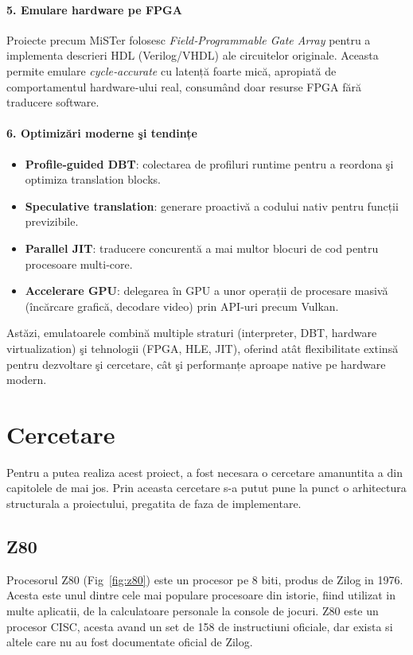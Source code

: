 \documentclass[titlepage,12pt]{article}
\begin{document}
\paragraph{5. Emulare hardware pe FPGA}  
Proiecte precum MiSTer folosesc \emph{Field‑Programmable Gate Array} pentru a implementa descrieri HDL (Verilog/VHDL) ale circuitelor originale. Aceasta permite emulare \emph{cycle‑accurate} cu latență foarte mică, apropiată de comportamentul hardware‑ului real, consumând doar resurse FPGA fără traducere software.

\paragraph{6. Optimizări moderne şi tendințe}  
\begin{itemize}
  \item \textbf{Profile‑guided DBT}: colectarea de profiluri runtime pentru a reordona şi optimiza translation blocks.  
  \item \textbf{Speculative translation}: generare proactivă a codului nativ pentru funcții pre­vizibile.  
  \item \textbf{Parallel JIT}: traducere concurentă a mai multor blocuri de cod pentru procesoare multi‑core.  
  \item \textbf{Accelerare GPU}: delegarea în GPU a unor operații de procesare masivă (încărcare grafică, decodare video) prin API‑uri precum Vulkan.  
\end{itemize}

Astăzi, emulatoarele combină multiple straturi (interpreter, DBT, hardware virtualization) şi tehnologii (FPGA, HLE, JIT), oferind atât flexibilitate extinsă pentru dezvoltare şi cercetare, cât şi performanțe aproape native pe hardware modern.

\section{Cercetare}
Pentru a putea realiza acest proiect, a fost necesara o cercetare amanuntita a din capitolele de mai jos.
Prin aceasta cercetare s-a putut pune la punct o arhitectura structurala a proiectului, pregatita de faza de implementare.

\subsection{\ac {Z80}}
Procesorul Z80 (Fig~\ref{fig:z80}) este un procesor pe 8 biti, produs de Zilog in 1976. Acesta este unul dintre cele mai populare procesoare din istorie, fiind utilizat in multe aplicatii, de la calculatoare personale la console de jocuri.
\ac {Z80} este un procesor CISC, acesta avand un set de 158 de instructiuni oficiale, dar exista si altele care nu au fost documentate oficial de Zilog.
\end{document}
